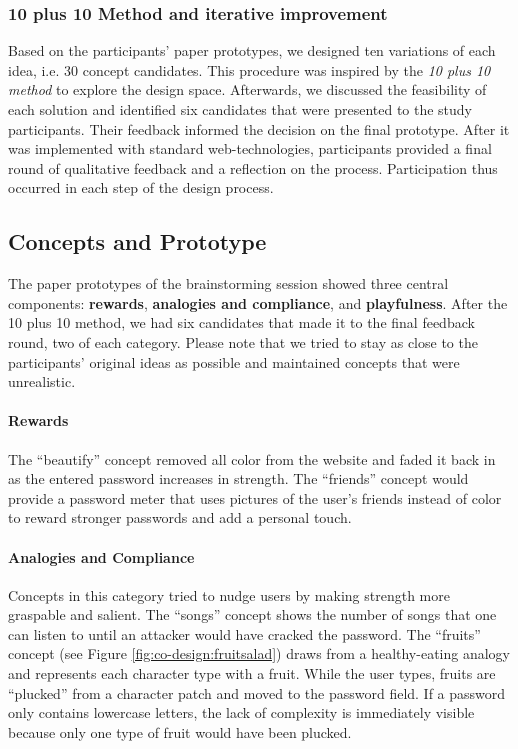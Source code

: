 \subsubsection{10 plus 10 Method and iterative improvement}
Based on the participants' paper prototypes, we designed ten variations of each idea, i.e. 30 concept candidates. This procedure was inspired by the \textit{10 plus 10 method} to explore the design space. %
Afterwards, we discussed the feasibility of each solution and identified six candidates that were presented to the study participants. Their feedback informed the decision on the final prototype. After it was implemented with standard web-technologies, participants provided a final round of qualitative feedback and a reflection on the process. Participation thus occurred in each step of the design process. 

\subsection{Concepts and Prototype}
The paper prototypes of the brainstorming session showed three central components: \textbf{rewards}, \textbf{analogies and compliance}, and \textbf{playfulness}. After the 10 plus 10 method, we had six candidates that made it to the final feedback round, two of each category. Please note that we tried to stay as close to the participants' original ideas as possible and maintained concepts that were unrealistic. 
\paragraph{Rewards} The ``beautify'' concept removed all color from the website and faded it back in as the entered password increases in strength. The ``friends'' concept would provide a password meter that uses pictures of the user's friends instead of color to reward stronger passwords and add a personal touch. 
\paragraph{Analogies and Compliance}
Concepts in this category tried to nudge users by making strength more graspable and salient. The ``songs'' concept shows the number of songs that one can listen to until an attacker would have cracked the password. The ``fruits'' concept (see Figure \ref{fig:co-design:fruitsalad}) draws from a healthy-eating analogy and represents each character type with a fruit. While the user types, fruits are ``plucked'' from a character patch and moved to the password field. If a password only contains lowercase letters, the lack of complexity is immediately visible because only one type of fruit would have been plucked. 
